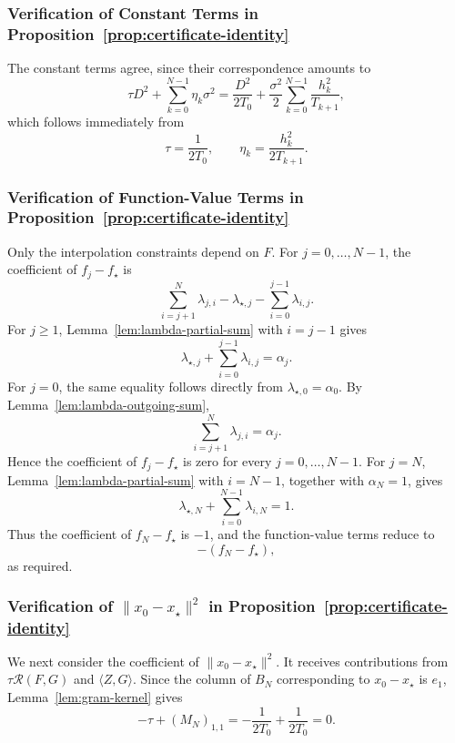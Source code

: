 \subsubsection{Verification of Constant Terms in Proposition~\ref{prop:certificate-identity}}
The constant terms agree, since their correspondence amounts to
\[\tau D^2+\sum_{k=0}^{N-1}\eta_k\sigma^2= \frac{D^2}{2T_0}
+\frac{\sigma^2}{2}\sum_{k=0}^{N-1}\frac{h_k^2}{T_{k+1}}, \]
which follows immediately from
\[ \tau=\frac{1}{2T_0}, \qquad \eta_k=\frac{h_k^2}{2T_{k+1}}. \]
\subsubsection{Verification of Function-Value Terms in Proposition~\ref{prop:certificate-identity}}
Only the interpolation constraints depend on $F$. For $j=0,\ldots,N-1$, the coefficient of $f_j-f_\star$ is
\[\sum_{i=j+1}^{N}\lambda_{j,i}-\lambda_{\star,j}-\sum_{i=0}^{j-1}\lambda_{i,j}.\]
For $j\ge1$, Lemma~\ref{lem:lambda-partial-sum} with $i=j-1$ gives
\[\lambda_{\star,j}+\sum_{i=0}^{j-1}\lambda_{i,j}=\alpha_j.\]
For $j=0$, the same equality follows directly from $\lambda_{\star,0}=\alpha_0$. By Lemma~\ref{lem:lambda-outgoing-sum},
\[ \sum_{i=j+1}^{N}\lambda_{j,i}=\alpha_j.\]
Hence the coefficient of $f_j-f_\star$ is zero for every $j=0,\ldots,N-1$.
For $j=N$, Lemma~\ref{lem:lambda-partial-sum} with $i=N-1$, together with $\alpha_N=1$, gives
\[\lambda_{\star,N}+\sum_{i=0}^{N-1}\lambda_{i,N}=1.\]
Thus the coefficient of $f_N-f_\star$ is $-1$, and the function-value terms reduce to
\[-(f_N-f_\star),\] as required.
\subsubsection{Verification of $\|x_0-x_\star\|^2$ in Proposition~\ref{prop:certificate-identity}}
We next consider the coefficient of $\|x_0-x_\star\|^2$. It receives contributions from $\tau\mathcal R(F,G)$ and $\langle Z,G\rangle$. Since the column of $B_N$ corresponding to $x_0-x_\star$ is $e_1$, Lemma~\ref{lem:gram-kernel} gives
\[-\tau+(M_N)_{1,1}=-\frac{1}{2T_0}+\frac{1}{2T_0}=0.\]

